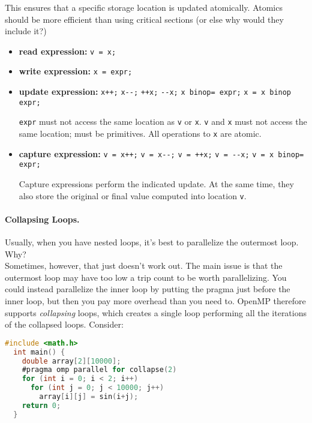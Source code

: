     This ensures that a specific storage location is updated
    atomically.  Atomics should be more efficient than using critical
    sections (or else why would they include it?)

\begin{itemize}[noitemsep]
\item  {\bf read expression:} {\tt v = x;}
  
\item   {\bf write expression:} {\tt x = expr;}

\item  {\bf update expression:} {\tt x++;} {\tt x{-}-;} {\tt ++x;} {\tt -{-}x;}
  {\tt x binop= expr;} {\tt x = x binop expr;}

    {\tt expr} must not access the same location as {\tt v} or {\tt x}.
    {\tt v} and {\tt x} must not access the same location; must be
      primitives.
    All operations to {\tt x} are atomic.

\item  {\bf capture expression:} {\tt v = x++;} {\tt v = x{-}-;} {\tt v = ++x;}
  {\tt v = -{-}x;} {\tt v = x binop= expr;}

  Capture expressions perform the indicated update. At the same time,
  they also store the original or final value computed into location
  {\tt v}.
\end{itemize}

\paragraph{Collapsing Loops.}
Usually, when you have nested loops, it's best to parallelize the
outermost loop. {\sf Why?} \\[2em]

Sometimes, however, that just doesn't work out. The main issue is that
the outermost loop may have too low a trip count to be worth
parallelizing. You could instead parallelize the inner loop by putting
the pragma just before the inner loop, but then you pay more overhead
than you need to. OpenMP therefore supports \emph{collapsing} loops,
which creates a single loop performing all the iterations of the
collapsed loops. Consider:

{\small
\begin{lstlisting}[language=C,morekeywords={foreach,pragma,omp,parallel,single,nowait,task,untied,barrier,taskyield}]
  #include <math.h>
  int main() {
    double array[2][10000];
    #pragma omp parallel for collapse(2)
    for (int i = 0; i < 2; i++)
      for (int j = 0; j < 10000; j++)
        array[i][j] = sin(i+j);
    return 0;
  }
\end{lstlisting}
}

